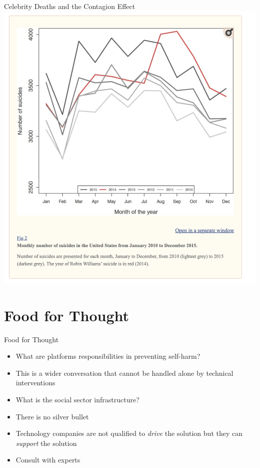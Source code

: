 \documentclass[nobackground,dvipsnames,table]{beamer}
\begin{document}
\begin{frame}{Celebrity Deaths and the Contagion Effect}
    \centering
    \includegraphics[height=0.88\textheight]{celebrity-deaths-contagion-effect}
\end{frame}

\section{Food for Thought}

\begin{frame}{Food for Thought}
    \begin{itemize}
        \item What are platforms responsibilities in preventing self-harm?
        \item This is a wider conversation that cannot be handled alone by technical interventions
        \item What is the social sector infrastructure?
        \item There is no silver bullet
        \item Technology companies are not qualified to \textit{drive} the solution but they can \textit{support} the solution
        \item Consult with experts
    \end{itemize}
\end{frame}
\end{document}
